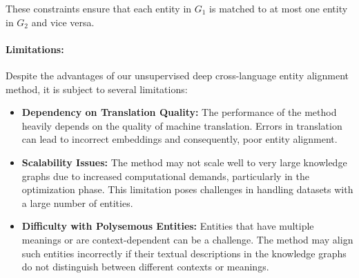 These constraints ensure that each entity in $G_1$ is matched to at most one entity in $G_2$ and vice versa.

\paragraph{Limitations:} Despite the advantages of our unsupervised deep cross-language entity alignment method, it is subject to several limitations:

\begin{itemize}
	\item \textbf{Dependency on Translation Quality:} The performance of the method heavily depends on the quality of machine translation. Errors in translation can lead to incorrect embeddings and consequently, poor entity alignment.
	
	\item \textbf{Scalability Issues:} The method may not scale well to very large knowledge graphs due to increased computational demands, particularly in the optimization phase. This limitation poses challenges in handling datasets with a large number of entities.
	
	\item \textbf{Difficulty with Polysemous Entities:} Entities that have multiple meanings or are context-dependent can be a challenge. The method may align such entities incorrectly if their textual descriptions in the knowledge graphs do not distinguish between different contexts or meanings.
	
\end{itemize}



